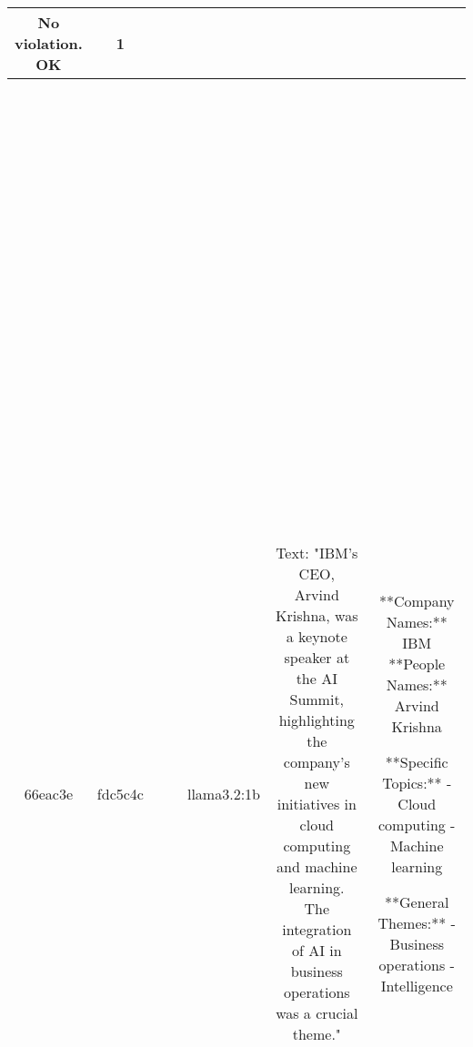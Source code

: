 \begin{table}[h!]
\begin{tabular}{|c|c|c|c|c|c|c|c|c|c|}
No violation.
OK & 1\\
\hline
66eac3e & fdc5c4c &  &  & llama3.2:1b & Text: "IBM's CEO, Arvind Krishna, was a keynote speaker at the AI Summit, highlighting the company's new initiatives in cloud computing and machine learning. The integration of AI in business operations was a crucial theme." & **Company Names:** IBM
**People Names:** Arvind Krishna

**Specific Topics:** 
- Cloud computing
- Machine learning

**General Themes:** 
- Business operations 
- Intelligence & ok & The chatbot output provides information structured in categories as specified in the description: Company names, People names, Specific topics, and General themes. In every category, it uses the singular or plural forms correctly, which complies with the format requested in the description. The section headers are correctly placed as bold text, in line with the intended formatted output. There is no evidence of any missing category, so the output maintains the desired structure. The evaluation must focus only on compliance with format and structure, so correctness—which would require knowing the input—is not in consideration here.

No violation.
OK & 1\\
\hline
bacea26 & fdc5c4c &  &  & gpt-4o-mini & Text: "A documentary on Silk Road chronicles the rise and fall of the famous online marketplace and its founder, Ross Ulbricht. Themes of digital crime and cybersecurity challenges were highlighted." & Company names: Silk Road
People names: Ross Ulbricht
Specific topics: digital crime, cybersecurity challenges
General themes: rise and fall of online marketplaces, impact of technology on crime & ok & The chatbot's output has been formatted correctly to comply with the desired format specified in the description. It includes four specified categories: Company names, People names, Specific topics, and General themes, each followed by lists of items. Each category is followed by a list of items separated by commas, as requested. Without input, it cannot be judged if the content inside each category is accurate, but the formatting strictly adheres to the guidelines provided in the description.

OK & 1\\
\hline
bacea26 & fdc5c4c &  &  & gemma2:9b & Text: "A documentary on Silk Road chronicles the rise and fall of the famous online marketplace and its founder, Ross Ulbricht. Themes of digital crime and cybersecurity challenges were highlighted." & Here's a breakdown of the entities in your text:


\end{tabular}
\end{table}
